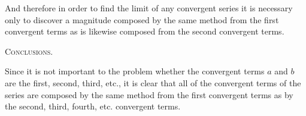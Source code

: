 \documentclass[11pt,letterpaper]{book}
\begin{document}
And therefore in order to find the limit of any convergent series it is
necessary only to discover a magnitude composed by the same method from the
first convergent terms as is likewise composed from the second convergent
terms.

\begin{samepage}
\begin{center}
\large\textsc{Conclusions.}
\end{center}

Since it is not important to the problem whether the convergent terms $a$ and
$b$ are the first, second, third, etc., it is clear that all of the convergent
terms of the series are composed by the same method from the first convergent
terms as by the second, third, fourth, etc. convergent terms.
\end{samepage}

\end{document}
